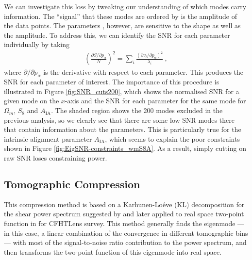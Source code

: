\documentclass[twocolumn]{\docclass}
\newcommand{\rf}[1]{Figure \ref{fig:#1}}
\def\bea{\begin{eqnarray}}
\def\eea{\end{eqnarray}}
\begin{document}
	We can investigate this loss by tweaking our understanding of which modes carry information. The ``signal'' that these modes are ordered by is the amplitude of the data points.  The parameters , however, are sensitive to the shape as well as the amplitude.
	To address this, we can identify the SNR for each parameter individually by taking
	\bea
	\left(\frac{\partial S/\partial p_\alpha}{N}\right)^2 = \sum_{i} \frac{(\partial v_i / \partial p_\alpha)^2}{\lambda_i}\
	,\eea
	where $\partial /\partial p_\alpha$ is the derivative with respect to each parameter. This produces the SNR for each parameter of interest. The importance of this procedure is illustrated in \rf{SNR_cuts200}, which shows the normalised SNR for a given mode on the $x$-axis and the SNR for each parameter for the same mode for $\Omega_m$, $S_8$ and $A_{\mathrm{IA}}$. The shaded region shows the 200 modes excluded in the previous analysis, so we clearly see that there are some low SNR modes there that contain information about the parameters. This is particularly true for the intrinsic alignment parameter $A_{\mathrm{IA}}$, which seems to explain the poor constraints shown in \rf{EigSNR-constraints_wmS8A}. As a result, simply cutting on raw SNR loses constraining power.
	
	\subsection{Tomographic Compression}
	\label{subsec:tomographic_compression}
	
	
	
	This compression method is based on a Karhunen-Lo\'eve (KL) decomposition for the shear power spectrum suggested by \citep{Alonso:2017hhj} and later applied to real space two-point function in \citep{Bellini:2019ssw} for CFHTLens survey. This method generally finds the eigenmode --- in this case, a linear combination of the convergence in different tomographic bins --- with most of the signal-to-noise ratio contribution to the power spectrum, and then transforms the two-point function of this eigenmode into real space.
	
	
	\newcommand\ctot{\mathcal{C}}
	
\end{document}
